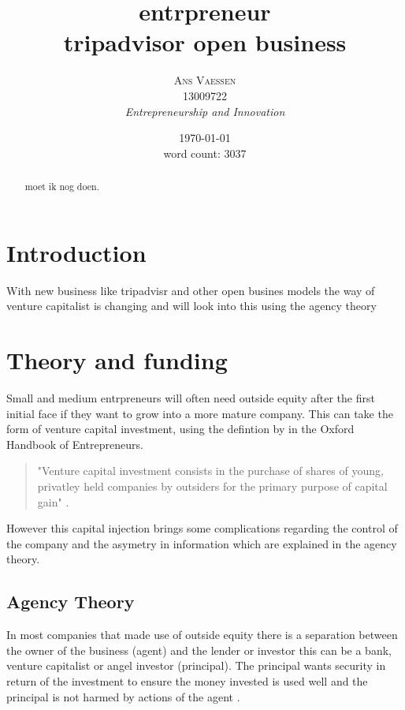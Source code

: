 \documentclass[a4paper, 11pt]{article}
\title{\textbf{entrpreneur}\\tripadvisor open business}
\author{\textsc{Ans Vaessen}
\\13009722
\\{\textit{Entrepreneurship and Innovation}}}
\date{\today\\
word count: 3037}
\begin{document}
\maketitle

\begin{abstract}
moet ik nog doen.
\end{abstract}



\vspace{30pt} %

\section*{Introduction}


With new business like tripadvisr and other open busines models the way of venture capitalist is changing and will  look into this using the agency theory


\section{Theory and funding}


Small and medium entrpreneurs will often need outside equity after the first initial face if they want to grow into a more mature company. This can take the form of venture capital investment, using the defintion by \citep{casson2008oxford} in the Oxford Handbook of Entrepreneurs.

\begin{quote}
"Venture capital investment consists in the purchase of shares of young, privatley held companies by outsiders for the primary purpose of capital gain" \citep[P.1]{casson2008oxford}.
\end{quote} 

However this capital injection brings some complications regarding the control of the company and the asymetry in information which are explained in the agency theory.


\subsection{Agency Theory}



In most companies that made use of outside equity there is a separation between the owner of the business (agent) and the lender or investor this can be a bank, venture capitalist or angel investor (principal). The principal wants security in return of the investment to ensure the money invested is used well and the principal is not harmed by actions of the agent \citep{jensen1976theory}.
\end{document}
